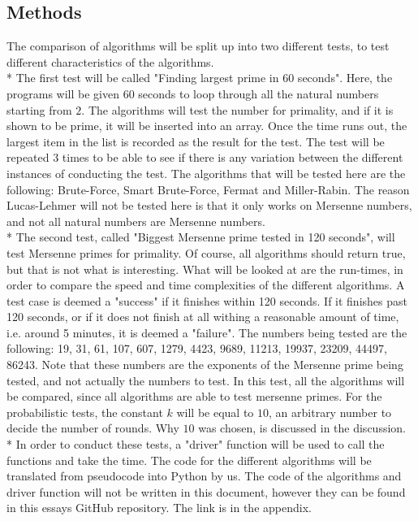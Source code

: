 \documentclass[main.tex]{subfiles}
\begin{document}
\subsection{Methods}
The comparison of algorithms will be split up into two different tests, to test different characteristics of the algorithms. 
\newline
\\*
The first test will be called "Finding largest prime in 60 seconds". Here, the programs will be given 60 seconds to loop through all the natural numbers starting from $2$. The algorithms will test the number for primality, and if it is shown to be prime, it will be inserted into an array. Once the time runs out, the largest item in the list is recorded as the result for the test. The test will be repeated 3 times to be able to see if there is any variation between the different instances of conducting the test. The algorithms that will be tested here are the following: Brute-Force, Smart Brute-Force, Fermat and Miller-Rabin. The reason Lucas-Lehmer will not be tested here is that it only works on Mersenne numbers, and not all natural numbers are Mersenne numbers. 
\newline
\\*
The second test, called "Biggest Mersenne prime tested in 120 seconds", will test Mersenne primes for primality. Of course, all algorithms should return true, but that is not what is interesting. What will be looked at are the run-times, in order to compare the speed and time complexities of the different algorithms. A test case is deemed a "success" if it finishes within 120 seconds. If it finishes past 120 seconds, or if it does not finish at all withing a reasonable amount of time, i.e. around 5 minutes, it is deemed a "failure". The numbers being tested are the following: 19, 31, 61, 107, 607, 1279, 4423, 9689, 11213, 19937, 23209, 44497, 86243. Note that these numbers are the exponents of the Mersenne prime being tested, and not actually the numbers to test. In this test, all the algorithms will be compared, since all algorithms are able to test mersenne primes. For the probabilistic tests, the constant $k$ will be equal to $10$, an arbitrary number to decide the number of rounds. Why $10$ was chosen, is discussed in the discussion. 
\newline
\\*
In order to conduct these tests, a "driver" function will be used to call the functions and take the time. The code for the different algorithms will be translated from pseudocode into Python by us. The code of the algorithms and driver function will not be written in this document, however they can be found in this essays GitHub repository. The link is in the appendix. 
\end{document}
